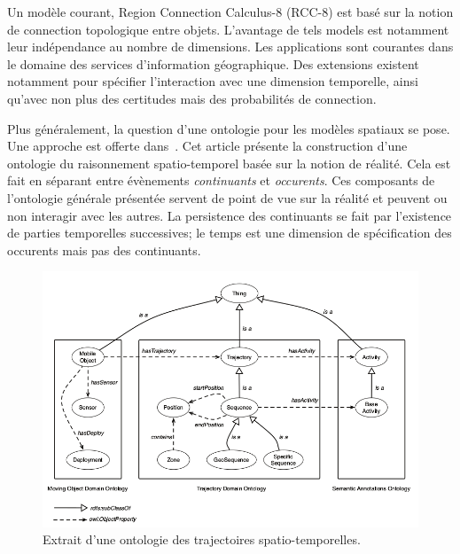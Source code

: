 \documentclass[french,12pt]{article}
\begin{document}
Un modèle courant, Region Connection Calculus-8 (RCC-8) est basé sur la notion de connection topologique entre objets\cite{schlieder_qualitative_1996,dorr_qualitative_2014}. L'avantage de tels models est notamment leur indépendance au nombre de dimensions. Les applications sont courantes dans le domaine des services d'information géographique\cite{bhatt_geospatial_2014}. Des extensions existent notamment pour spécifier l'interaction avec une dimension temporelle\cite{hazarika_qualitative_2012}, ainsi qu'avec non plus des certitudes mais des probabilités de connection\cite{girlea_probabilistic_2012}.





Plus généralement, la question d'une ontologie pour les modèles spatiaux se pose. Une approche est offerte dans~\cite{grenon_formal_2003}. Cet article présente la construction d'une ontologie du raisonnement spatio-temporel basée sur la notion de réalité. Cela est fait en séparant entre évènements \textit{continuants} et \textit{occurents}. Ces composants de l'ontologie générale présentée servent de point de vue sur la réalité et peuvent ou non interagir avec les autres. La persistence des continuants se fait par l'existence de parties temporelles successives; le temps est une dimension de spécification des occurents mais pas des continuants.

\begin{figure}[h]
    \centering
    \includegraphics[scale=0.40]{images/ontologie.png}
    \caption{Extrait d'une ontologie des trajectoires spatio-temporelles.}
    \label{fig.ontologies}
\end{figure}
\end{document}
